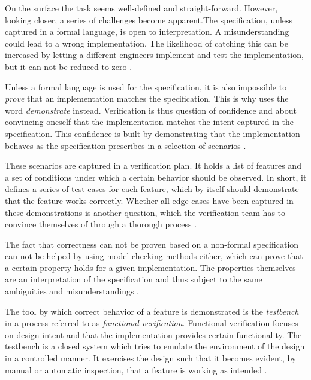 \documentclass[11pt,a4paper]{report}
\begin{document}
On the surface the task seems well-defined and straight-forward. However, looking closer, a series of challenges
become apparent.The specification, unless captured in a formal language, is open to interpretation. A
misunderstanding could lead to a wrong implementation. The likelihood of catching this can be increased by
letting a different engineers implement and test the implementation, but it can not be reduced to zero \cite[Ch.
1]{bergeron2012writing}.

Unless a formal language is used for the specification, it is also impossible to \textit{prove} that an
implementation matches the specification. This is why \citeauthor{bergeron2012writing} uses the word
\textit{demonstrate} instead. Verification is thus question of confidence and about convincing oneself that the
implementation matches the intent captured in the specification. This confidence is built by demonstrating that the
implementation behaves as the specification prescribes in a selection of scenarios \cite[Ch. 1]{bergeron2012writing}.

These scenarios are captured in a verification plan. It holds a list of features and a set of conditions under which
a certain behavior should be observed. In short, it defines a series of test cases for each feature, which by itself
should demonstrate that the feature works correctly. Whether all edge-cases have been captured in these
demonstrations is another question, which the verification team has to convince themselves of through a thorough
process \cite[Ch. 1]{bergeron2012writing}.

The fact that correctness can not be proven based on a non-formal specification can not be helped by using model checking
methods either, which can prove that a certain property holds for a given implementation. The properties themselves
are an interpretation of the specification and thus subject to the same ambiguities and misunderstandings \cite[Ch.
1]{bergeron2012writing}.

The tool by which correct behavior of a feature is demonstrated is the \textit{testbench} in a process referred to as
\textit{functional verification}. Functional verification focuses on design intent and that the implementation
provides certain functionality. The testbench is a closed system which tries to emulate the environment of the design
in a controlled manner. It exercises the design such that it becomes evident, by manual or automatic inspection, that
a feature is working as intended \cite[Ch. 1]{bergeron2012writing}.
\end{document}
